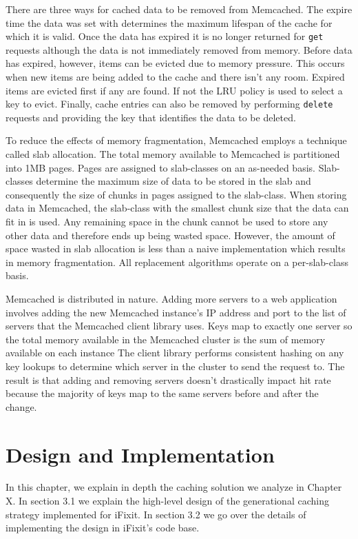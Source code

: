 \documentclass[12pt]{ucthesis}
\begin{document}
There are three ways for cached data to be removed from {\textsf Memcached}.
The expire time the data was set with determines the maximum lifespan of the cache for which it is valid.
Once the data has expired it is no longer returned for {\tt get} requests although the data is not immediately removed from memory.
Before data has expired, however, items can be evicted due to memory pressure.
This occurs when new items are being added to the cache and there isn't any room.
Expired items are evicted first if any are found.
If not the LRU policy is used to select a key to evict.
Finally, cache entries can also be removed by performing {\tt delete} requests and providing the key that identifies the data to be deleted.

To reduce the effects of memory fragmentation, {\textsf Memcached} employs a technique called slab allocation.
The total memory available to {\textsf Memcached} is partitioned into 1MB pages.
Pages are assigned to slab-classes on an as-needed basis.
Slab-classes determine the maximum size of data to be stored in the slab and consequently the size of chunks in pages assigned to the slab-class.
When storing data in {\textsf Memcached}, the slab-class with the smallest chunk size that the data can fit in is used.
Any remaining space in the chunk cannot be used to store any other data and therefore ends up being wasted space.
However, the amount of space wasted in slab allocation is less than a naive implementation which results in memory fragmentation. %
All replacement algorithms operate on a per-slab-class basis.

{\textsf Memcached} is distributed in nature.
Adding more servers to a web application involves adding the new {\textsf Memcached} instance's IP address and port to the list of servers that the {\textsf Memcached} client library uses.
Keys map to exactly one server so the total memory available in the {\textsf Memcached} cluster is the sum of memory available on each instance
The client library performs consistent hashing on any key lookups to determine which server in the cluster to send the request to.
The result is that adding and removing servers doesn't drastically impact hit rate because the majority of keys map to the same servers before and after the change.


\chapter{Design and Implementation}
\label{designAndImplementation}
In this chapter, we explain in depth the caching solution we analyze in Chapter X.
In section 3.1 we explain the high-level design of the generational caching strategy implemented for iFixit.
In section 3.2 we go over the details of implementing the design in iFixit's code base.
\end{document}
